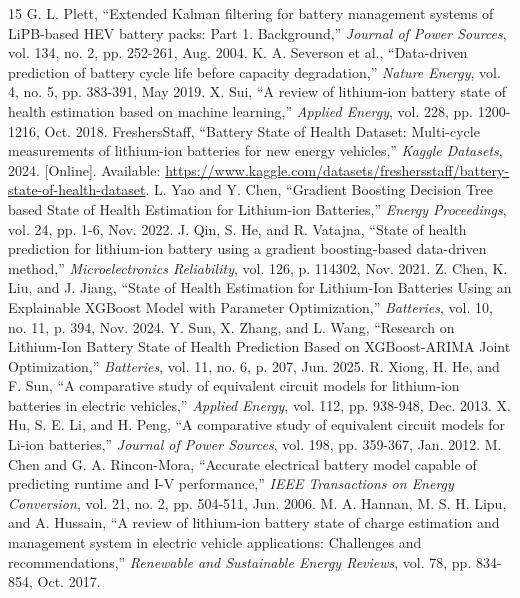 \documentclass[conference]{IEEEtran}
\begin{document}
\begin{thebibliography}{15}
 G. L. Plett, ``Extended Kalman filtering for battery management systems of LiPB-based HEV battery packs: Part 1. Background,'' \textit{Journal of Power Sources}, vol. 134, no. 2, pp. 252-261, Aug. 2004.
 K. A. Severson et al., ``Data-driven prediction of battery cycle life before capacity degradation,'' \textit{Nature Energy}, vol. 4, no. 5, pp. 383-391, May 2019.
 X. Sui, ``A review of lithium-ion battery state of health estimation based on machine learning,'' \textit{Applied Energy}, vol. 228, pp. 1200-1216, Oct. 2018.
 FreshersStaff, ``Battery State of Health Dataset: Multi-cycle measurements of lithium-ion batteries for new energy vehicles,'' \textit{Kaggle Datasets}, 2024. [Online]. Available: \url{https://www.kaggle.com/datasets/freshersstaff/battery-state-of-health-dataset}.
 L. Yao and Y. Chen, ``Gradient Boosting Decision Tree based State of Health Estimation for Lithium-ion Batteries,'' \textit{Energy Proceedings}, vol. 24, pp. 1-6, Nov. 2022.
 J. Qin, S. He, and R. Vatajna, ``State of health prediction for lithium-ion battery using a gradient boosting-based data-driven method,'' \textit{Microelectronics Reliability}, vol. 126, p. 114302, Nov. 2021.
 Z. Chen, K. Liu, and J. Jiang, ``State of Health Estimation for Lithium-Ion Batteries Using an Explainable XGBoost Model with Parameter Optimization,'' \textit{Batteries}, vol. 10, no. 11, p. 394, Nov. 2024.
 Y. Sun, X. Zhang, and L. Wang, ``Research on Lithium-Ion Battery State of Health Prediction Based on XGBoost-ARIMA Joint Optimization,'' \textit{Batteries}, vol. 11, no. 6, p. 207, Jun. 2025.
 R. Xiong, H. He, and F. Sun, ``A comparative study of equivalent circuit models for lithium-ion batteries in electric vehicles,'' \textit{Applied Energy}, vol. 112, pp. 938-948, Dec. 2013.
 X. Hu, S. E. Li, and H. Peng, ``A comparative study of equivalent circuit models for Li-ion batteries,'' \textit{Journal of Power Sources}, vol. 198, pp. 359-367, Jan. 2012.
 M. Chen and G. A. Rincon-Mora, ``Accurate electrical battery model capable of predicting runtime and I-V performance,'' \textit{IEEE Transactions on Energy Conversion}, vol. 21, no. 2, pp. 504-511, Jun. 2006.
 M. A. Hannan, M. S. H. Lipu, and A. Hussain, ``A review of lithium-ion battery state of charge estimation and management system in electric vehicle applications: Challenges and recommendations,'' \textit{Renewable and Sustainable Energy Reviews}, vol. 78, pp. 834-854, Oct. 2017.

\end{thebibliography}
\end{document}
